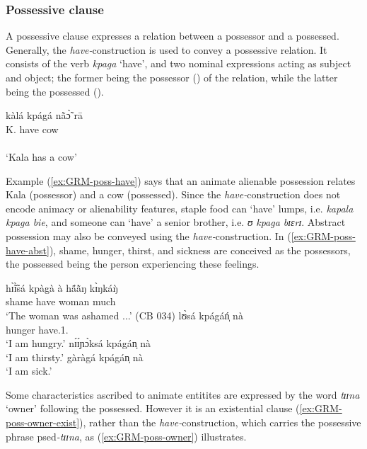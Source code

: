 \subsubsection{Possessive clause}
\label{sec:GRM-poss-cl}

A possessive clause expresses a relation between  a
possessor and a possessed.  Generally,  the  {\it
have-}construction  is used to convey a possessive relation. It consists of
the verb {\it kpaga} `have',  and two nominal expressions acting as subject and
object; the former being the possessor (\psor) of the relation, while  the
latter being  the possessed
(\psed).

\ea\label{ex:GRM-poss-have}
\glll kàlá kpágá nã̀ɔ̃̀ rā\\
K. have cow {\foc}\\
  {\psor} {}   {\psed} {} \\
\glt  `Kala has a cow'
\z

Example (\ref{ex:GRM-poss-have}) says that an animate alienable possession
relates  Kala (possessor) and a cow (possessed).  Since the  {\it
have-}construction does not encode animacy or alienability features,   staple
food can `have' lumps, i.e. {\it kapala kpaga bie}, and someone can `have' a
senior brother, i.e. {\it ʊ kpaga bɪɛrɪ}.  Abstract possession may also be
conveyed using the {\it have-}construction. In (\ref{ex:GRM-poss-have-abst}),
  shame, hunger,  thirst, and sickness are conceived as the possessors, the
possessed being the person experiencing these feelings. 



\ea\label{ex:GRM-poss-have-abst}

 \ea\label{ex:GRM-poss-have-abst-1}
\gll hɪ̃̀ɪ̃̀sá kpàgà   à   hã́ã̀ŋ    kɪ̀ŋkáŋ̀   \\
shame       have    {\art}   woman    much\\
\glt `The woman was ashamed ...' (CB 034)
\ex\label{ex:GRM-poss-have-abst-2}
\gll lʊ̀sá kpágáń̩ nà\\
hunger have.{1.\sg} {\foc}\\
\glt `I am hungry.'
\ex\label{ex:GRM-poss-have-abst-3}
nɪ́ɪ́ɲɔ̀ksá kpágán̩ nà \\
`I am thirsty.'
\ex\label{ex:GRM-poss-have-abst-4}
gàràgá kpágán̩ nà \\
`I am sick.'

\z 
 \z

Some characteristics ascribed to animate entitites are expressed by  the
word {\it tɪɪna} `owner' following the possessed.  However it
is an existential clause (\ref{ex:GRM-poss-owner-exist}), rather than the  {\it
have-}construction, which carries the
possessive phrase {\sc psed}{\it -tɪɪna}, as (\ref{ex:GRM-poss-owner})
illustrates.



